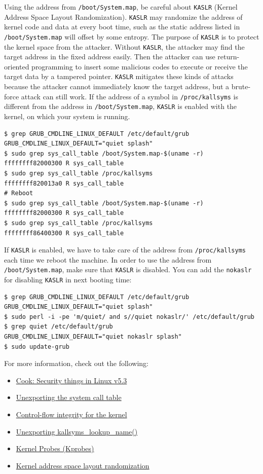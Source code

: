\documentclass[10pt, oneside]{book}
\begin{document}
Using the address from \verb|/boot/System.map|, be careful about \verb|KASLR| (Kernel Address Space Layout Randomization).
\verb|KASLR| may randomize the address of kernel code and data at every boot time, such as the static address listed in \verb|/boot/System.map| will offset by some entropy.
The purpose of \verb|KASLR| is to protect the kernel space from the attacker.
Without \verb|KASLR|, the attacker may find the target address in the fixed address easily.
Then the attacker can use return-oriented programming to insert some malicious codes to execute or receive the target data by a tampered pointer.
\verb|KASLR| mitigates these kinds of attacks because the attacker cannot immediately know the target address, but a brute-force attack can still work.
If the address of a symbol in \verb|/proc/kallsyms| is different from the address in \verb|/boot/System.map|, \verb|KASLR| is enabled with the kernel, on which your system is running.
\begin{verbatim}
$ grep GRUB_CMDLINE_LINUX_DEFAULT /etc/default/grub
GRUB_CMDLINE_LINUX_DEFAULT="quiet splash"
$ sudo grep sys_call_table /boot/System.map-$(uname -r)
ffffffff82000300 R sys_call_table
$ sudo grep sys_call_table /proc/kallsyms
ffffffff820013a0 R sys_call_table
# Reboot
$ sudo grep sys_call_table /boot/System.map-$(uname -r)
ffffffff82000300 R sys_call_table
$ sudo grep sys_call_table /proc/kallsyms
ffffffff86400300 R sys_call_table
\end{verbatim}
If \verb|KASLR| is enabled, we have to take care of the address from \verb|/proc/kallsyms| each time we reboot the machine.
In order to use the address from \verb|/boot/System.map|, make sure that \verb|KASLR| is disabled.
You can add the \verb|nokaslr| for disabling \verb|KASLR| in next booting time:
\begin{verbatim}
$ grep GRUB_CMDLINE_LINUX_DEFAULT /etc/default/grub
GRUB_CMDLINE_LINUX_DEFAULT="quiet splash"
$ sudo perl -i -pe 'm/quiet/ and s//quiet nokaslr/' /etc/default/grub
$ grep quiet /etc/default/grub
GRUB_CMDLINE_LINUX_DEFAULT="quiet nokaslr splash"
$ sudo update-grub
\end{verbatim}

For more information, check out the following:

\begin{itemize}
  \item \href{https://lwn.net/Articles/804849/}{Cook: Security things in Linux v5.3}
  \item \href{https://lwn.net/Articles/12211/}{Unexporting the system call table}
  \item \href{https://lwn.net/Articles/810077/}{Control-flow integrity for the kernel}
  \item \href{https://lwn.net/Articles/813350/}{Unexporting kallsyms\_lookup\_name()}
  \item \href{https://www.kernel.org/doc/Documentation/kprobes.txt}{Kernel Probes (Kprobes)}
  \item \href{https://lwn.net/Articles/569635/}{Kernel address space layout randomization}
\end{itemize}
\end{document}
